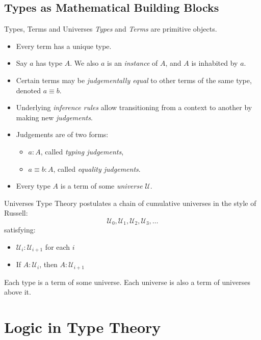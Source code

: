 \documentclass[10pt, aspectratio=169]{beamer}
\newcommand{\U}{\mathcal{U}}
\newcommand{\deq}{\equiv}
\newcommand{\0}{\mathbf{0}}
\newcommand{\1}{\mathbf{1}}
\newcommand{\2}{\mathbf{2}}
\begin{document}
\subsection{Types as Mathematical Building Blocks}

\begin{frame}{Types, Terms and Universes}
  \emph{Types} and \emph{Terms} are primitive objects.
  \begin{itemize}
    \item Every term has a unique type.
    \item Say $a$ has type $A$. We also $a$ is an \emph{instance} of $A$, and $A$ is inhabited by $a$.
    \item Certain terms may be \emph{judgementally equal} to other terms of the same type, denoted $a \deq b$.
    \item Underlying \emph{inference rules} allow transitioning from a context to another by making new \emph{judgements}.
    \item Judgements are of two forms:
    \begin{itemize}
      \item $a : A$, called \emph{typing judgements},
      \item $a \deq b : A$, called \emph{equality judgements}.
    \end{itemize}
    \item Every type $A$ is a term of some \emph{universe } $\U$.
  \end{itemize}
\end{frame}

\begin{frame}{Universes}
  Type Theory postulates a chain of cumulative universes in the style of Russell:
  \[
    \U_0, \U_1, \U_2, \U_3, \ldots
  \]
  satisfying:
  \begin{itemize}
    \item $\U_i : \U_{i+1}$ for each $i$
    \item If $A : \U_i$, then $A : \U_{i+1}$
  \end{itemize}
  Each type is a term of some universe.
  Each universe is also a term of universes above it.
\end{frame}

\section{Logic in Type Theory}
\end{document}
